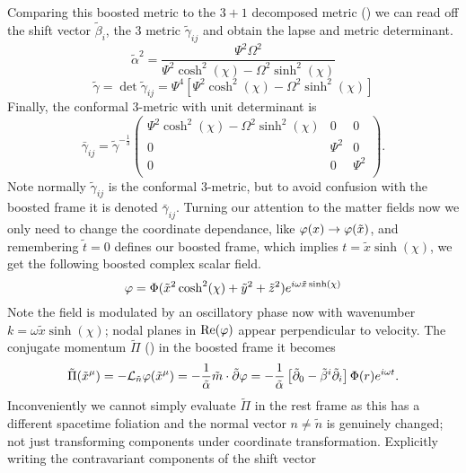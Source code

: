 Comparing this boosted metric to the $3+1$ decomposed metric () we can read off the shift vector $\tilde{\beta}_i$, the 3 metric $\tilde{\gamma}_{ij}$ and obtain the lapse and metric determinant.
\begin{equation} \tilde{\alpha}^2 = \frac{\Psi ^2 \Omega ^2}{\Psi ^2 \cosh ^2(\chi) -\Omega ^2 \sinh ^2(\chi) } \end{equation}
\begin{equation}\tilde{\gamma} = \det \tilde{\gamma}_{ij} = \Psi^4\left[ \Psi^2 \cosh^2 (\chi) - \Omega^2 \sinh^2(\chi)\right]\end{equation}
Finally, the conformal 3-metric with unit determinant is 
\begin{equation} \bar{\gamma}_{ij} = \tilde{\gamma}^{-\frac{1}{3}}\left(
\begin{array}{ccc}
 \Psi ^2 \cosh ^2(\chi) -\Omega ^2 \sinh ^2(\chi)  & 0 & 0 \\
 0 & \Psi ^2 & 0 \\
 0 & 0 & \Psi ^2 \\
\end{array}
\right).\end{equation}
Note normally $\tilde{\gamma}_{ij}$ is the conformal 3-metric, but to avoid confusion with the boosted frame it is denoted $\bar{\gamma}_{ij}$. Turning our attention to the matter fields now we only need to change the coordinate dependance, like $\varphi(x)\rightarrow \varphi(\tilde{x})$, and remembering $\tilde{t}=0$ defines our boosted frame, which implies $t = \tilde{x}\sinh(\chi)$, we get the following boosted complex scalar field.
\begin{equation}\varphi = \Phi(\tilde{x}^2\cosh^2(\chi) +\tilde{y}^2 + \tilde{z}^2)e^{i\omega \tilde{x}\sinh(\chi)} \end{equation}
Note the field is modulated by an oscillatory phase now with wavenumber $k = \omega \tilde{x} \sinh(\chi)$; nodal planes in $\Re(\varphi)$ appear perpendicular to velocity. The conjugate momentum $\tilde{\Pi}$ () in the boosted frame it becomes 
\begin{equation} \tilde{\Pi}(\tilde{x}^\mu) = -\mathcal{L}_{\tilde{n}} \varphi(\tilde{x}^\mu)=-\frac{1}{\tilde{\alpha}}\tilde{m}\cdot \tilde{\partial}\varphi = -\frac{1}{\tilde{\alpha}}\left[ \tilde{\partial}_0 - \tilde{\beta}^i\tilde{\partial}_{i}\right]\Phi(r)e^{i\omega t}.\end{equation}
Inconveniently we cannot simply evaluate $\tilde{\Pi}$ in the rest frame as this has a different spacetime foliation and the normal vector $n\neq \tilde{n}$ is genuinely changed; not just transforming components under coordinate transformation. Explicitly writing the contravariant components of the shift vector 
